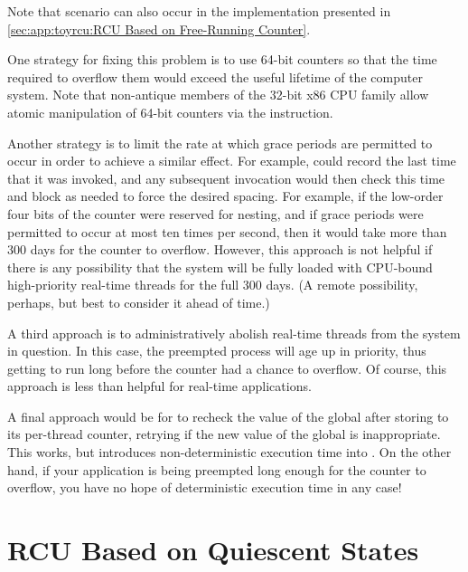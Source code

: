 {{	Note that scenario can also occur in the implementation presented in
	\cref{sec:app:toyrcu:RCU Based on Free-Running Counter}.

	One strategy for fixing this problem is to use 64-bit
	counters so that the time required to overflow them would exceed
	the useful lifetime of the computer system.
	Note that non-antique members of the 32-bit x86 CPU family
	allow atomic manipulation of 64-bit counters via the
	 instruction.

	Another strategy is to limit the rate at which grace periods are
	permitted to occur in order to achieve a similar effect.
	For example,  could record the last time
	that it was invoked, and any subsequent invocation would then
	check this time and block as needed to force the desired
	spacing.
	For example, if the low-order four bits of the counter were
	reserved for nesting, and if grace periods were permitted to
	occur at most ten times per second, then it would take more
	than 300 days for the counter to overflow.
	However, this approach is not helpful if there is any possibility
	that the system will be fully loaded with CPU-bound high-priority
	real-time threads for the full 300 days.
	(A remote possibility, perhaps, but best to consider it ahead
	of time.)

	A third approach is to administratively abolish real-time threads
	from the system in question.
	In this case, the preempted process will age up in priority,
	thus getting to run long before the counter had a chance to
	overflow.
	Of course, this approach is less than helpful for real-time
	applications.

	A final approach would be for  to recheck
	the value of the global  after storing to its
	per-thread  counter, retrying if the new
	value of the global  is inappropriate.
	This works, but introduces non-deterministic execution time
	into .
	On the other hand, if your application is being preempted long
	enough for the counter to overflow, you have no hope of
	deterministic execution time in any case!
}\QuickQuizEndE
}

\section{RCU Based on Quiescent States}
\label{sec:app:toyrcu:RCU Based on Quiescent States}

